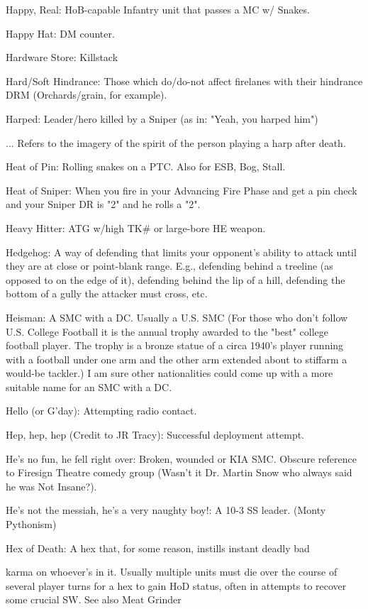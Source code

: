 \documentclass[letterpaper]{article}
\begin{document}
Happy, Real: HoB-capable Infantry unit that passes a MC w/ Snakes.

Happy Hat: DM counter.

Hardware Store: Killstack

Hard/Soft Hindrance: Those which do/do-not affect firelanes with their hindrance DRM (Orchards/grain, for example).

Harped:  Leader/hero killed by a Sniper (as in: "Yeah, you harped him")

... Refers to the imagery of the spirit of the person playing a harp after death.

Heat of Pin: Rolling snakes on a PTC. Also for ESB, Bog, Stall.

Heat of Sniper: When you fire in your Advancing Fire Phase and get a pin check and your Sniper DR is "2" and he rolls a "2".

Heavy Hitter: ATG w/high TK\# or large-bore HE weapon.

Hedgehog: A way of defending that limits your opponent's ability to attack until they are at close or point-blank range. E.g., defending behind a treeline (as opposed to on the edge of it), defending behind the lip of a hill, defending the bottom of a gully the attacker must cross, etc.

Heisman: A SMC with a DC.  Usually a U.S. SMC (For those who don't follow U.S. College Football it is the annual trophy awarded to the "best" college football player.  The trophy is a bronze statue of a circa 1940's player running with a football under one arm and the other arm extended about to stiffarm a would-be tackler.)  I am sure other nationalities could come up with a more suitable name for an SMC with a DC.

Hello (or G'day): Attempting radio contact.

Hep, hep, hep (Credit to JR Tracy): Successful deployment attempt.

He's no fun, he fell right over: Broken, wounded or KIA SMC.  Obscure reference to Firesign Theatre comedy group (Wasn't it Dr. Martin Snow who always said he was Not Insane?).

He's not the messiah, he's a very naughty boy!: A 10-3 SS leader. (Monty Pythonism)

Hex of Death: A hex that, for some reason, instills instant deadly bad

karma on whoever's in it. Usually multiple units must die over the course of several player turns for a hex to gain HoD status, often in attempts to recover some crucial SW. See also Meat Grinder
\end{document}
